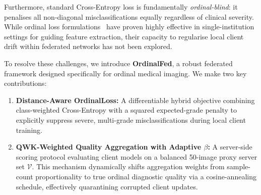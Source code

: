 Furthermore, standard Cross-Entropy loss is fundamentally
\emph{ordinal-blind}: it penalises all non-diagonal misclassifications
equally regardless of clinical severity. While ordinal loss
formulations~\cite{polat2024cdwce,toledocortes2022dqor} have proven
highly effective in single-institution settings for guiding feature
extraction, their capacity to regularise local client drift within
federated networks has not been explored.

To resolve these challenges, we introduce \textbf{OrdinalFed}, a robust
federated framework designed specifically for ordinal medical imaging.
We make two key contributions:
\begin{enumerate}[leftmargin=*]
  \item \textbf{Distance-Aware OrdinalLoss:} A differentiable hybrid
  objective combining class-weighted Cross-Entropy with a squared
  expected-grade penalty to explicitly suppress severe, multi-grade
  misclassifications during local client training.
  \item \textbf{QWK-Weighted Quality Aggregation with Adaptive $\beta$:}
  A server-side scoring protocol evaluating client models on a balanced
  50-image proxy server set $\mathcal{V}$. This mechanism dynamically
  shifts aggregation weights from sample-count proportionality to true
  ordinal diagnostic quality via a cosine-annealing schedule, effectively
  quarantining corrupted client updates.
\end{enumerate}
